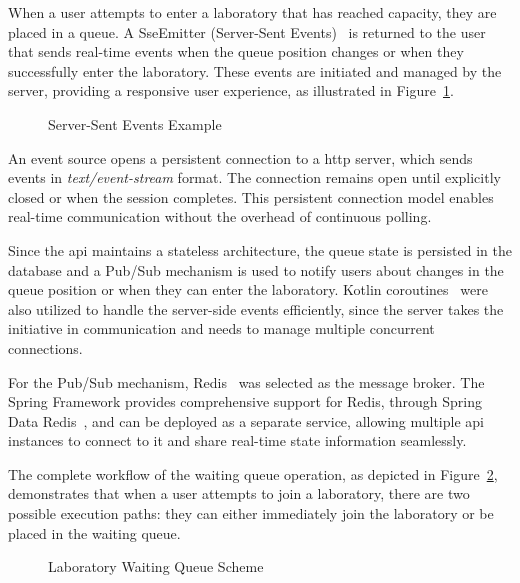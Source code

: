 When a user attempts to enter a laboratory that has reached capacity, they are placed in a queue. A SseEmitter (Server-Sent Events)~\cite{sse-emitter,server-sent-events} is returned to the user that sends real-time events when the queue position changes or when they successfully enter the laboratory. These events are initiated and managed by the server, providing a responsive user experience, as illustrated in Figure~\ref{fig:event_source}.

\begin{figure}[H]
    \centering
    
    \caption{Server-Sent Events Example}
    \label{fig:event_source}
\end{figure}

An event source opens a persistent connection to a \acs{http} server, which sends events in \textit{text/event-stream} format. The connection remains open until explicitly closed or when the session completes. This persistent connection model enables real-time communication without the overhead of continuous polling.

Since the \acs{api} maintains a stateless architecture, the queue state is persisted in the database and a Pub/Sub mechanism is used to notify users about changes in the queue position or when they can enter the laboratory. Kotlin coroutines~\cite{kotlin-coroutines} were also utilized to handle the server-side events efficiently, since the server takes the initiative in communication and needs to manage multiple concurrent connections.

For the Pub/Sub mechanism, Redis~\cite{redis} was selected as the message broker. The Spring Framework provides comprehensive support for Redis, through Spring Data Redis~\cite{spring-redis-support}, and can be deployed as a separate service, allowing multiple \acs{api} instances to connect to it and share real-time state information seamlessly.

The complete workflow of the waiting queue operation, as depicted in Figure~\ref{fig:lab_waiting_queue}, demonstrates that when a user attempts to join a laboratory, there are two possible execution paths: they can either immediately join the laboratory or be placed in the waiting queue.

\begin{figure}[H]
    \centering
    
    \caption{Laboratory Waiting Queue Scheme}
    \label{fig:lab_waiting_queue}
\end{figure}

